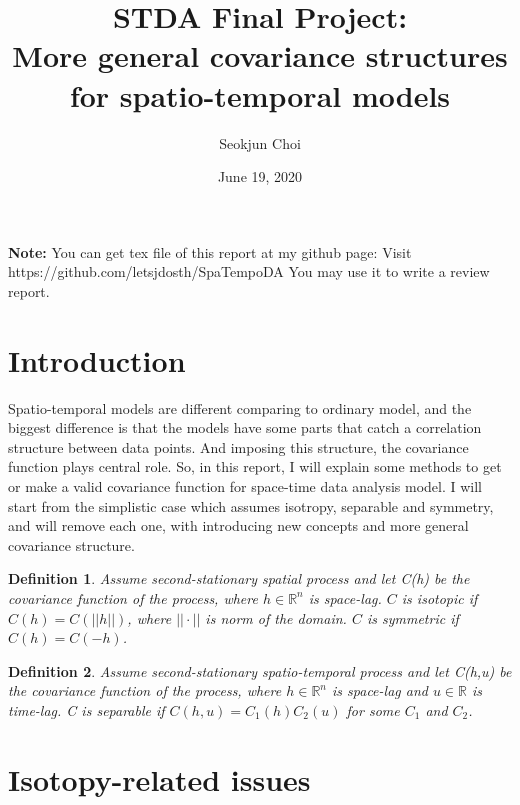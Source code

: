 \documentclass{article}
\newtheorem*{definition}{Definition}
\begin{document}
\title{STDA Final Project: \\ More general covariance structures for spatio-temporal models}
\author{Seokjun Choi}
\date{June 19, 2020}
\maketitle

\textbf{Note:}
You can get tex file of this report at my github page: Visit https://github.com/letsjdosth/SpaTempoDA
You may use it to write a review report.

\section{Introduction}

Spatio-temporal models are different comparing to ordinary model, and the biggest difference is that
the models have some parts that catch a correlation structure between data points.
And imposing this structure, the covariance function plays central role.
So, in this report, I will explain some methods to get or make a valid covariance function for space-time data analysis model.
I will start from the simplistic case which assumes isotropy, separable and symmetry,
and will remove each one, with introducing new concepts and more general covariance structure.
\begin{definition}
    Assume second-stationary spatial process and let C(h) be the covariance function of the process, where $h\in\mathbb R^n$ is space-lag.
    $C$ is isotopic if $C(h)=C(||h||)$, where $||\cdot||$ is norm of the domain.
    $C$ is symmetric if $C(h)=C(-h)$.
\end{definition}
\begin{definition}
    Assume second-stationary spatio-temporal process and let C(h,u) be the covariance function of the process, where $h\in\mathbb R^n$ is space-lag and $u\in\mathbb R$ is time-lag.
    C is separable if $C(h,u)=C_1(h)C_2(u)$ for some $C_1$ and $C_2$.
\end{definition}

\section{Isotopy-related issues}
\end{document}
